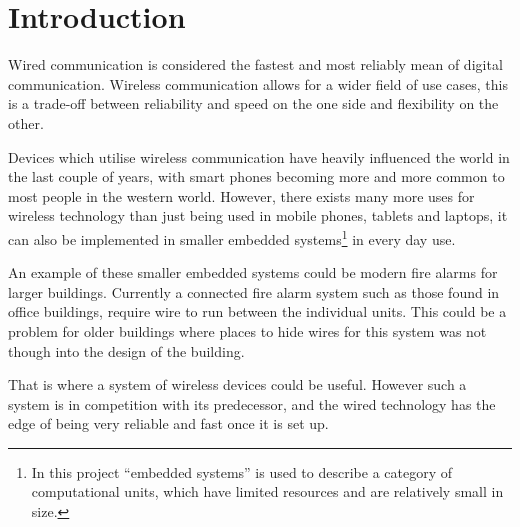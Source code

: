 \chapter{Introduction}
\vspace{-20pt}
Wired communication is considered the fastest and  most reliably mean of digital communication.
Wireless communication allows for a wider field of use cases, this is a trade-off between reliability and speed on the one side and flexibility on the other. \cite{wirelessTradeoffs}

Devices which utilise wireless communication have heavily influenced the world in the last couple of years, with smart phones becoming more and more common to most people in the western world. \cite{2013-SmartPhoneUse}
However, there exists many more uses for wireless technology than just being used in mobile phones, tablets and laptops, it can also be implemented in smaller embedded systems\footnote{In this project \enquote{embedded systems} is used to describe a category of computational units, which have limited resources and are relatively small in size. } in every day use.



An example of these smaller embedded systems could be modern fire alarms for larger buildings.
Currently a connected fire alarm system such as those found in office buildings, require wire to run between the individual units.
This could be a problem for older buildings where places to hide wires for this system was not though into the design of the building.

That is where a system of wireless devices could be useful. 
However such a system is in competition with its predecessor, and the wired technology has the edge of being very reliable and fast once it is set up. 

